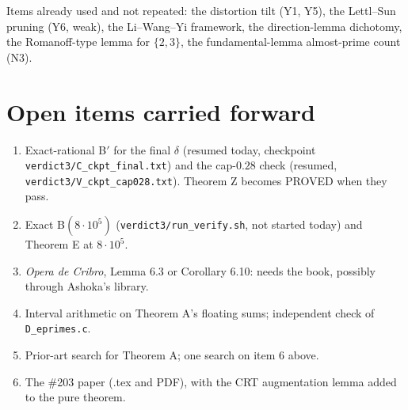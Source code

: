 \documentclass[11pt,a4paper]{article}
\begin{document}
Items already used and not repeated: the distortion tilt (Y1, Y5), the Lettl--Sun pruning (Y6, weak), the Li--Wang--Yi framework, the direction-lemma dichotomy, the Romanoff-type lemma for $\{2,3\}$, the fundamental-lemma almost-prime count (N3).

\section{Open items carried forward}
\begin{enumerate}
\item Exact-rational B$'$ for the final $\delta$ (resumed today, checkpoint \texttt{verdict3/C\_ckpt\_final.txt}) and the cap-$0.28$ check (resumed, \texttt{verdict3/V\_ckpt\_cap028.txt}). Theorem Z becomes PROVED when they pass.
\item Exact B$(8\cdot10^5)$ (\texttt{verdict3/run\_verify.sh}, not started today) and Theorem E at $8\cdot10^5$.
\item \emph{Opera de Cribro}, Lemma 6.3 or Corollary 6.10: needs the book, possibly through Ashoka's library.
\item Interval arithmetic on Theorem A's floating sums; independent check of \texttt{D\_eprimes.c}.
\item Prior-art search for Theorem A; one search on item 6 above.
\item The \#203 paper (.tex and PDF), with the CRT augmentation lemma added to the pure theorem.
\end{enumerate}
\end{document}
